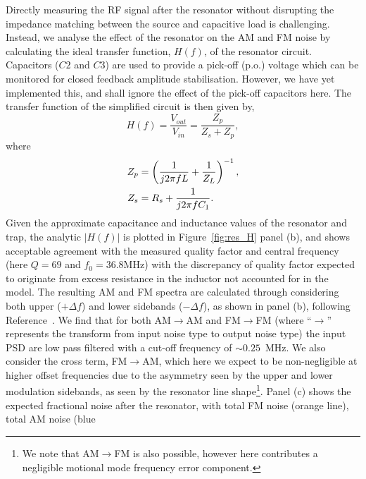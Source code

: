     Directly measuring the RF signal after the resonator without disrupting the impedance matching between the source and capacitive load is challenging.
    Instead, we analyse the effect of the resonator on the AM and FM noise by calculating the ideal transfer function, $H(f)$, of the resonator circuit. 
    Capacitors ($C2$ and $C3$) are used to provide a pick-off (p.o.) voltage
    which can be monitored for closed feedback amplitude stabilisation. 
    However, we have yet implemented this, and shall ignore the effect of
    the pick-off capacitors here. 
    The transfer function of the simplified
    circuit is then given by,
    \begin{equation}
        H(f) = \frac{V_{out}}{V_{in}} = \frac{Z_p}{Z_s + Z_p},
    \end{equation}
    where
    \begin{equation}
        \begin{split}
            Z_p &= \Large\left(\frac{1}{j2\pi f L} + \frac{1}{Z_L}\Large\right)^{-1}, \\
            Z_s &= R_s + \frac{1}{j2\pi f C_1}.
        \end{split}
    \end{equation}
    Given the approximate capacitance and inductance values of the resonator and
    trap, the analytic $|H(f)|$ is plotted in Figure~\ref{fig:res_H} panel
    (b), and shows acceptable agreement with the measured quality factor and central
    frequency (here $Q = 69$ and $f_0=36.8\unit{\mega\hertz}$) with the discrepancy of quality factor expected to originate from excess resistance in the inductor not accounted for in the model. 
    The resulting AM and FM
    spectra are calculated through considering both upper ($+\Delta f$) and
    lower sidebands ($-\Delta f$), as shown in panel (b), following Reference~\cite{danielson_am_2018}. We
    find that for both AM$\rightarrow$AM and FM$\rightarrow$FM (where
    ``$\rightarrow$'' represents the transform from input noise type to output
    noise type) the input PSD are
    low pass filtered with a cut-off frequency of $\sim 0.25$~MHz.
    We also consider the cross term, FM$\rightarrow$AM, which here we expect to
    be non-negligible at higher offset frequencies due to the asymmetry seen by the upper and lower modulation sidebands, as seen by the resonator line shape\footnote{We note that AM$\rightarrow$FM is also possible, however here contributes a negligible motional mode frequency error component.}. Panel (c) shows the expected fractional noise after
    the resonator, with total FM noise (orange line), total AM noise (blue
